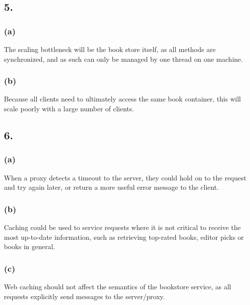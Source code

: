 \documentclass[12pt]{article}
\begin{document}
\subsection*{5.} %

\subsubsection*{(a)} %

The scaling bottleneck will be the book store itself, as all methods are synchronized, and as such can only be managed by one thread on one machine.

\subsubsection*{(b)} %

Because all clients need to ultimately access the same book container, this will scale poorly with a large number of clients.

\subsection*{6.} %

\subsubsection*{(a)} %

When a proxy detects a timeout to the server, they could hold on to the request and try again later, or return a more useful error message to the client.

\subsubsection*{(b)} %

Caching could be used to service requests where it is not critical to receive the most up-to-date information, such as retrieving top-rated books, editor picks or books in general.

\subsubsection*{(c)} %

Web caching should not affect the semantics of the bookstore service, as all requests explicitly send messages to the server/proxy.
\end{document}
